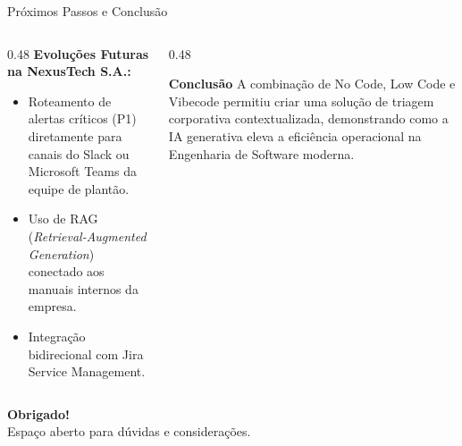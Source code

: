 \documentclass[aspectratio=169, 10pt]{beamer}
\begin{document}
\begin{frame}{Próximos Passos e Conclusão}
    \begin{columns}[T]
        \begin{column}{0.48\textwidth}
            \textbf{Evoluções Futuras na NexusTech S.A.:}
            \begin{itemize}
                \item Roteamento de alertas críticos (P1) diretamente para canais do Slack ou Microsoft Teams da equipe de plantão.
                \item Uso de RAG (\textit{Retrieval-Augmented Generation}) conectado aos manuais internos da empresa.
                \item Integração bidirecional com Jira Service Management.
            \end{itemize}
        \end{column}

        \begin{column}{0.48\textwidth}
            \begin{block}{\textbf{Conclusão}}
                A combinação de No Code, Low Code e Vibecode permitiu criar uma solução de triagem corporativa contextualizada, demonstrando como a IA generativa eleva a eficiência operacional na Engenharia de Software moderna.
            \end{block}
        \end{column}
    \end{columns}

    \vspace{0.5cm}
    \begin{center}
        \large \textbf{Obrigado!} \\
        \normalsize Espaço aberto para dúvidas e considerações.
    \end{center}
\end{frame}
\end{document}
